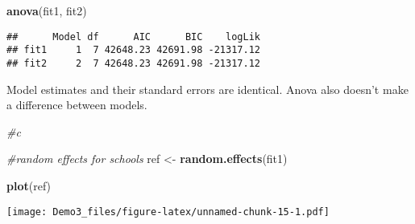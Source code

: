 \documentclass[
]{article}
\newenvironment{Shaded}{\begin{snugshade}}{\end{snugshade}}
\newcommand{\CommentTok}[1]{\textcolor[rgb]{0.56,0.35,0.01}{\textit{#1}}}
\newcommand{\FunctionTok}[1]{\textcolor[rgb]{0.13,0.29,0.53}{\textbf{#1}}}
\newcommand{\NormalTok}[1]{#1}
\newcommand{\OtherTok}[1]{\textcolor[rgb]{0.56,0.35,0.01}{#1}}
\begin{document}
\begin{Shaded}
\begin{Highlighting}[]
\FunctionTok{anova}\NormalTok{(fit1, fit2)}
\end{Highlighting}
\end{Shaded}

\begin{verbatim}
##      Model df      AIC      BIC    logLik
## fit1     1  7 42648.23 42691.98 -21317.12
## fit2     2  7 42648.23 42691.98 -21317.12
\end{verbatim}

Model estimates and their standard errors are identical. Anova also
doesn't make a difference between models.

\begin{Shaded}
\begin{Highlighting}[]
\CommentTok{\#c}

\CommentTok{\#random effects for schools}
\NormalTok{ref }\OtherTok{\textless{}{-}} \FunctionTok{random.effects}\NormalTok{(fit1)}

\FunctionTok{plot}\NormalTok{(ref)}
\end{Highlighting}
\end{Shaded}

\texttt{[image: Demo3\_files/figure-latex/unnamed-chunk-15-1.pdf]}
\end{document}
